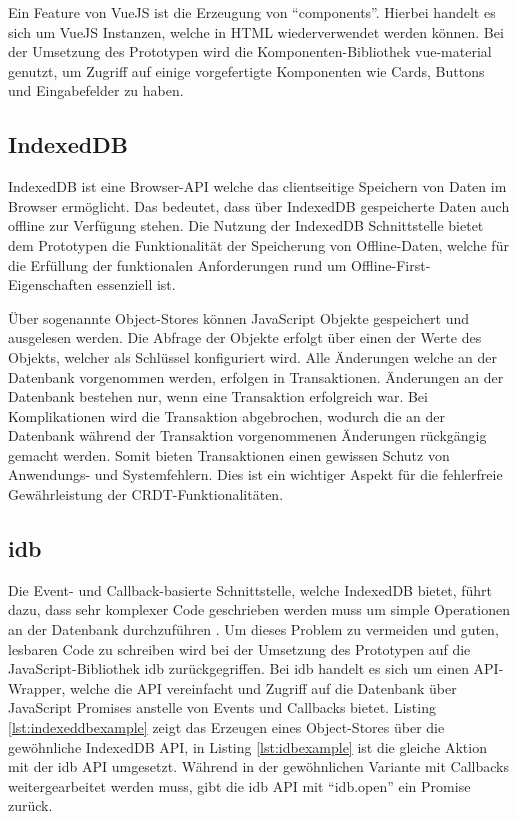 \documentclass[a4paper, 12pt]{scrreprt}
\begin{document}
Ein Feature von VueJS ist die Erzeugung von \enquote{components}. Hierbei handelt es sich um VueJS Instanzen, welche in HTML wiederverwendet werden können. Bei der Umsetzung des Prototypen wird die Komponenten-Bibliothek vue-material genutzt, um Zugriff auf einige vorgefertigte Komponenten wie Cards, Buttons und Eingabefelder zu haben. 
\subsection{IndexedDB}
IndexedDB ist eine Browser-API welche das clientseitige Speichern von Daten im Browser ermöglicht. Das bedeutet, dass über IndexedDB gespeicherte Daten auch offline zur Verfügung stehen. Die Nutzung der IndexedDB Schnittstelle bietet dem Prototypen die Funktionalität der Speicherung von Offline-Daten, welche für die Erfüllung der funktionalen Anforderungen rund um Offline-First-Eigenschaften essenziell ist. 

Über sogenannte Object-Stores können JavaScript Objekte gespeichert und ausgelesen werden. Die Abfrage der Objekte erfolgt über einen der Werte des Objekts, welcher als Schlüssel konfiguriert wird. Alle Änderungen welche an der Datenbank vorgenommen werden, erfolgen in Transaktionen. Änderungen an der Datenbank bestehen nur, wenn eine Transaktion erfolgreich war. Bei Komplikationen wird die Transaktion abgebrochen, wodurch die an der Datenbank während der Transaktion vorgenommenen Änderungen rückgängig gemacht werden. Somit bieten Transaktionen einen gewissen Schutz von Anwendungs- und Systemfehlern. Dies ist ein wichtiger Aspekt für die fehlerfreie Gewährleistung der CRDT-Funktionalitäten.
\subsection{idb}
\label{sec:idb}
Die Event- und Callback-basierte Schnittstelle, welche IndexedDB bietet, führt dazu, dass sehr komplexer Code geschrieben werden muss um simple Operationen an der Datenbank durchzuführen \autocite{InproceedingsIDBdoof}. Um dieses Problem zu vermeiden und guten, lesbaren Code zu schreiben wird bei der Umsetzung des Prototypen auf die JavaScript-Bibliothek idb zurückgegriffen. Bei idb handelt es sich um einen API-Wrapper, welche die API vereinfacht und Zugriff auf die Datenbank über JavaScript Promises anstelle von Events und Callbacks bietet. Listing \ref{lst:indexeddbexample} zeigt das Erzeugen eines Object-Stores über die gewöhnliche IndexedDB API, in Listing \ref{lst:idbexample} ist die gleiche Aktion mit der idb API umgesetzt. Während in der gewöhnlichen Variante mit Callbacks weitergearbeitet werden muss, gibt die idb API mit \enquote{idb.open} ein Promise zurück.
\end{document}
